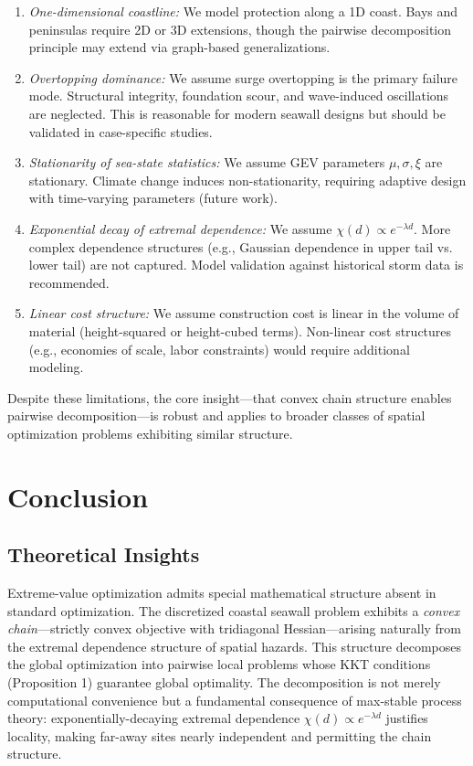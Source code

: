 \documentclass[12pt]{article}
\theoremstyle{definition}
\begin{document}
\begin{enumerate}
    \item \emph{One-dimensional coastline:} We model protection along a 1D coast. Bays and peninsulas require 2D or 3D extensions, though the pairwise decomposition principle may extend via graph-based generalizations.

    \item \emph{Overtopping dominance:} We assume surge overtopping is the primary failure mode. Structural integrity, foundation scour, and wave-induced oscillations are neglected. This is reasonable for modern seawall designs but should be validated in case-specific studies.

    \item \emph{Stationarity of sea-state statistics:} We assume GEV parameters $\mu, \sigma, \xi$ are stationary. Climate change induces non-stationarity, requiring adaptive design with time-varying parameters (future work).

    \item \emph{Exponential decay of extremal dependence:} We assume $\chi(d) \propto e^{-\lambda d}$. More complex dependence structures (e.g., Gaussian dependence in upper tail vs. lower tail) are not captured. Model validation against historical storm data is recommended.

    \item \emph{Linear cost structure:} We assume construction cost is linear in the volume of material (height-squared or height-cubed terms). Non-linear cost structures (e.g., economies of scale, labor constraints) would require additional modeling.
\end{enumerate}

Despite these limitations, the core insight---that convex chain structure enables pairwise decomposition---is robust and applies to broader classes of spatial optimization problems exhibiting similar structure.

\section*{Conclusion}

\subsection*{Theoretical Insights}

Extreme-value optimization admits special mathematical structure absent in standard optimization. The discretized coastal seawall problem exhibits a \emph{convex chain}---strictly convex objective with tridiagonal Hessian---arising naturally from the extremal dependence structure of spatial hazards. This structure decomposes the global optimization into pairwise local problems whose KKT conditions (Proposition 1) guarantee global optimality. The decomposition is not merely computational convenience but a fundamental consequence of max-stable process theory: exponentially-decaying extremal dependence $\chi(d) \propto e^{-\lambda d}$ justifies locality, making far-away sites nearly independent and permitting the chain structure.
\end{document}
